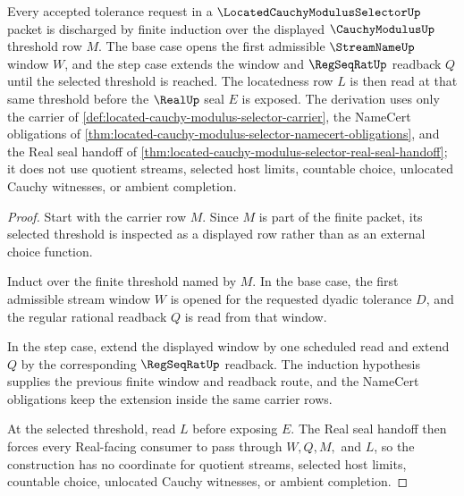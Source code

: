 \begin{theorem}
\label{thm:located-cauchy-modulus-selector-threshold-induction}
Every accepted tolerance request in a $\LocatedCauchyModulusSelectorUp$ packet is discharged by finite induction over the displayed $\CauchyModulusUp$ threshold row $M$. The base case opens the first admissible $\StreamNameUp$ window $W$, and the step case extends the window and $\RegSeqRatUp$ readback $Q$ until the selected threshold is reached. The locatedness row $L$ is then read at that same threshold before the $\RealUp$ seal $E$ is exposed. The derivation uses only the carrier of \autoref{def:located-cauchy-modulus-selector-carrier}, the NameCert obligations of \autoref{thm:located-cauchy-modulus-selector-namecert-obligations}, and the Real seal handoff of \autoref{thm:located-cauchy-modulus-selector-real-seal-handoff}; it does not use quotient streams, selected host limits, countable choice, unlocated Cauchy witnesses, or ambient completion.
\end{theorem}
\begin{proof}
Start with the carrier row $M$. Since $M$ is part of the finite packet, its selected threshold is inspected as a displayed row rather than as an external choice function.

Induct over the finite threshold named by $M$. In the base case, the first admissible stream window $W$ is opened for the requested dyadic tolerance $D$, and the regular rational readback $Q$ is read from that window.

In the step case, extend the displayed window by one scheduled read and extend $Q$ by the corresponding $\RegSeqRatUp$ readback. The induction hypothesis supplies the previous finite window and readback route, and the NameCert obligations keep the extension inside the same carrier rows.

At the selected threshold, read $L$ before exposing $E$. The Real seal handoff then forces every Real-facing consumer to pass through $W,Q,M,$ and $L$, so the construction has no coordinate for quotient streams, selected host limits, countable choice, unlocated Cauchy witnesses, or ambient completion.
\end{proof}


